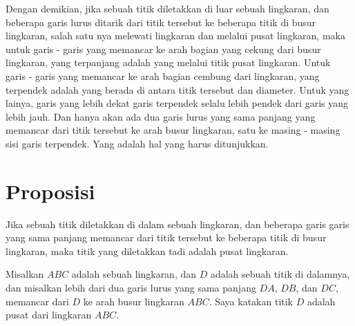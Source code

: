 \documentclass[a4paper]{book}
\begin{document}
Dengan demikian, jika sebuah titik diletakkan di luar sebuah lingkaran, 
dan beberapa garis lurus
ditarik dari titik tersebut ke beberapa titik di busur lingkaran, salah satu
nya melewati lingkaran dan melalui pusat lingkaran, maka untuk garis - garis
yang memancar ke arah bagian yang cekung dari busur lingkaran, yang terpanjang
adalah yang melalui titik pusat lingkaran. Untuk garis - garis yang memancar
ke arah bagian cembung dari lingkaran, yang terpendek adalah yang berada di
antara titik tersebut dan diameter.  Untuk yang lainya, garis yang lebih
dekat garis terpendek selalu
lebih pendek dari garis yang lebih jauh. Dan hanya akan ada dua garis lurus 
yang sama panjang yang memancar dari titik tersebut ke arah busur lingkaran,
satu ke masing - masing sisi garis terpendek. Yang adalah hal yang harus
ditunjukkan.

\section*{\centering Proposisi \thesection}
Jika sebuah titik diletakkan di dalam sebuah lingkaran, dan beberapa garis 
garis yang sama panjang memancar dari titik tersebut ke beberapa titik di
busur lingkaran, maka titik yang diletakkan tadi adalah pusat lingkaran.

Misalkan $ABC$ adalah sebuah lingkaran, dan $D$ adalah sebuah titik di 
dalamnya, dan misalkan lebih dari dua garis lurus yang sama panjang $DA$, 
$DB$, dan $DC$, memancar dari $D$ ke arah busur lingkaran $ABC$. Saya katakan 
titik $D$ adalah pusat dari lingkaran $ABC$.
\end{document}
